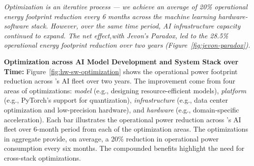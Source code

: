 \textit{Optimization is an iterative process --- we achieve an average of 20\% operational energy footprint reduction every 6 months across the machine learning hardware-software stack. However, over the same time period, AI infrastructure capacity continued to expand. The net effect,with Jevon's Paradox, led to the 28.5\% operational energy footprint reduction over two years (Figure~\ref{fig:jevon-paradox}).}
\fi

\textbf{Optimization across AI Model Development and System Stack over Time:}
Figure~\ref{fig:hw-sw-optimization} shows the operational power footprint reduction across \fb's AI fleet over two years. 
The improvement come from four areas of optimizations: \textit{model} (e.g., designing resource-efficient models), \textit{platform} (e.g., PyTorch's support for quantization), \textit{infrastructure} (e.g., data center optimization and low-precision hardware), and \textit{hardware} (e.g., domain-specific acceleration).
Each bar illustrates the operational power reduction across \fb's AI fleet over 6-month period from each of the optimization areas.
The optimizations in aggregate provide, on average, a 20\% reduction in operational power consumption every six months. 
The compounded benefits highlight the need for cross-stack optimizations. 



